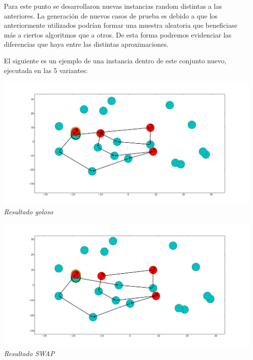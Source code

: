 Para este punto se desarrollaron nuevas instancias random distintas a las anteriores. La generación de nuevos casos de prueba es debido a que los anteriormente utilizados podrían formar una muestra aleatoria que beneficiase más a ciertos algoritmos que a otros. De esta forma podremos evidenciar las diferencias que haya entre las distintas aproximaciones.

El siguiente es un ejemplo de una instancia dentro de este conjunto nuevo, ejecutada en las 5 variantes:

\vspace*{0.3cm} \vspace*{0.3cm}
  \begin{center}
\includegraphics[scale=0.3]{./EJ5/caminoEjGoloso.png}
\\{\textit{Resultado goloso}}
  \end{center}
  \vspace*{0.3cm}
  
  \vspace*{0.3cm} \vspace*{0.3cm}
  \begin{center}
\includegraphics[scale=0.3]{./EJ5/caminoEjswap.png}
\\{\textit{Resultado SWAP}}
  \end{center}
  \vspace*{0.3cm}

